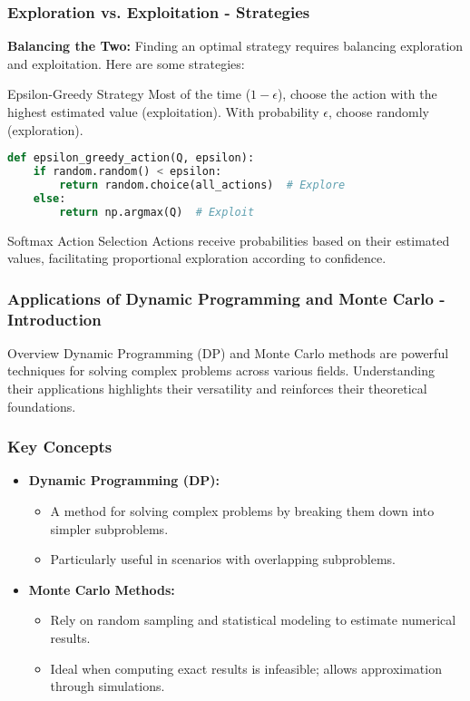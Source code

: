 \documentclass[aspectratio=169]{beamer}
\begin{document}
\begin{frame}[fragile]
    \frametitle{Exploration vs. Exploitation - Strategies}
    \textbf{Balancing the Two:}
    Finding an optimal strategy requires balancing exploration and exploitation. Here are some strategies:

    \begin{block}{Epsilon-Greedy Strategy}
        Most of the time ($1 - \epsilon$), choose the action with the highest estimated value (exploitation). With probability $\epsilon$, choose randomly (exploration).

        \begin{lstlisting}[language=Python]
def epsilon_greedy_action(Q, epsilon):
    if random.random() < epsilon:
        return random.choice(all_actions)  # Explore
    else:
        return np.argmax(Q)  # Exploit
        \end{lstlisting}
    \end{block}
    
    \begin{block}{Softmax Action Selection}
        Actions receive probabilities based on their estimated values, facilitating proportional exploration according to confidence.
    \end{block}
\end{frame}

\begin{frame}[fragile]
    \frametitle{Applications of Dynamic Programming and Monte Carlo - Introduction}
    \begin{block}{Overview}
        Dynamic Programming (DP) and Monte Carlo methods are powerful techniques for solving complex problems across various fields. Understanding their applications highlights their versatility and reinforces their theoretical foundations.
    \end{block}
\end{frame}

\begin{frame}[fragile]
    \frametitle{Key Concepts}
    \begin{itemize}
        \item \textbf{Dynamic Programming (DP):}
            \begin{itemize}
                \item A method for solving complex problems by breaking them down into simpler subproblems.
                \item Particularly useful in scenarios with overlapping subproblems.
            \end{itemize}
        \item \textbf{Monte Carlo Methods:}
            \begin{itemize}
                \item Rely on random sampling and statistical modeling to estimate numerical results.
                \item Ideal when computing exact results is infeasible; allows approximation through simulations.
            \end{itemize}
    \end{itemize}
\end{frame}
\end{document}
